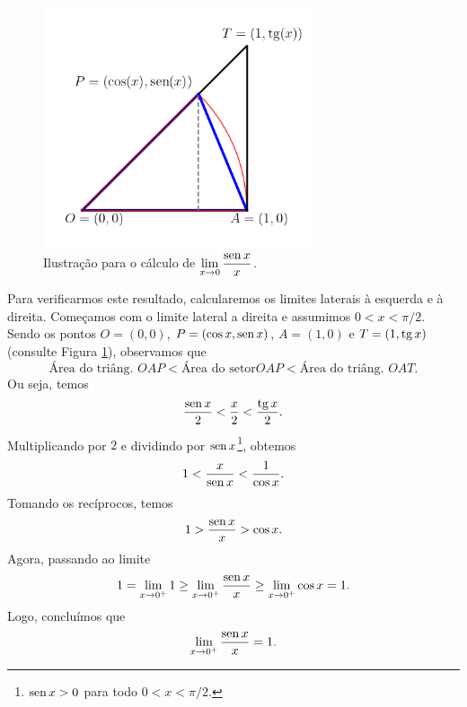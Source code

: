 \begin{figure}[H]
  \centering
  \includegraphics[width=0.7\textwidth]{./cap_lim/dados/figLimSenxOx/fig}
  \caption{Ilustração para o cálculo de $\displaystyle\lim_{x\to 0}\frac{\operatorname{sen} x}{x}$.}
  \label{fig:limSenxOx}
\end{figure}

Para verificarmos este resultado, calcularemos os limites laterais à esquerda e à direita. Começamos com o limite lateral a direita e assumimos $0<x<\pi/2$. Sendo os pontos $O=(0,0)$, $P=(\cos x,\operatorname{sen} x)$, $A = (1,0)$ e $T = (1, \operatorname{tg} x)$ (consulte Figura \ref{fig:limSenxOx}), observamos que
\begin{equation}
  \text{Área do triâng. } OAP < \text{Área do setor} OAP < \text{Área do triâng. } OAT.
\end{equation}
Ou seja, temos
\begin{equation}
  \frac{\operatorname{sen} x}{2} < \frac{x}{2} < \frac{\operatorname{tg} x}{2}.
\end{equation}
Multiplicando por $2$ e dividindo por $\operatorname{sen} x$\footnote{$\operatorname{sen} x > 0$ para todo $0< x < \pi/2$.}, obtemos
\begin{equation}
  1 < \frac{x}{\operatorname{sen} x} < \frac{1}{\cos x}.
\end{equation}
Tomando os recíprocos, temos
\begin{equation}
  1 > \frac{\operatorname{sen} x}{x} > \cos x.
\end{equation}
Agora, passando ao limite
\begin{equation}
  1 = \lim_{x\to 0^+} 1 \geq \lim_{x\to 0^+} \frac{\operatorname{sen} x}{x} \geq \lim_{x\to 0^+} \cos x = 1.
\end{equation}
Logo, concluímos que
\begin{equation}
  \lim_{x\to 0^+} \frac{\operatorname{sen} x}{x} = 1.
\end{equation}

